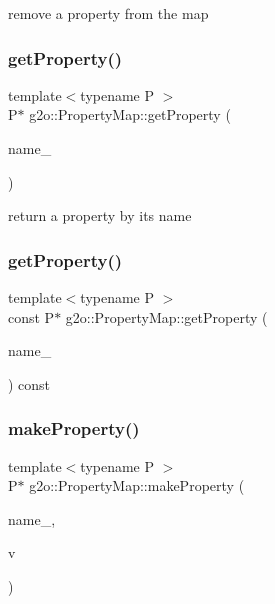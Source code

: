 remove a property from the map \mbox{\label{classg2o_1_1_property_map_ab3a37fb6f8358f3c63a13678349f1f82}} 
\subsubsection{\texorpdfstring{get\+Property()}{getProperty()}\hspace{0.1cm}{\footnotesize\ttfamily [1/2]}}
{\footnotesize\ttfamily template$<$typename P $>$ \\
P$\ast$ g2o\+::\+Property\+Map\+::get\+Property (\begin{DoxyParamCaption}\item[{const std\+::string \&}]{name\+\_\+ }\end{DoxyParamCaption})\hspace{0.3cm}{\ttfamily [inline]}}

return a property by its name \mbox{\label{classg2o_1_1_property_map_a9b09845c08bdfb682a13516d4eacd452}} 
\subsubsection{\texorpdfstring{get\+Property()}{getProperty()}\hspace{0.1cm}{\footnotesize\ttfamily [2/2]}}
{\footnotesize\ttfamily template$<$typename P $>$ \\
const P$\ast$ g2o\+::\+Property\+Map\+::get\+Property (\begin{DoxyParamCaption}\item[{const std\+::string \&}]{name\+\_\+ }\end{DoxyParamCaption}) const\hspace{0.3cm}{\ttfamily [inline]}}

\mbox{\label{classg2o_1_1_property_map_add6e602dcd651b8883c30c350d23692f}} 
\subsubsection{\texorpdfstring{make\+Property()}{makeProperty()}}
{\footnotesize\ttfamily template$<$typename P $>$ \\
P$\ast$ g2o\+::\+Property\+Map\+::make\+Property (\begin{DoxyParamCaption}\item[{const std\+::string \&}]{name\+\_\+,  }\item[{const typename P\+::\+Value\+Type \&}]{v }\end{DoxyParamCaption})\hspace{0.3cm}{\ttfamily [inline]}}

